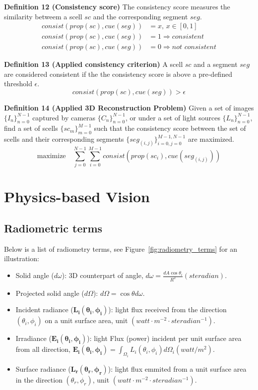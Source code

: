 \noindent\textbf{Definition 12 (Consistency score)} The consistency score measures the similarity betweem a scell $sc$ and the corresponding segment $seg$.
\begin{align*}
consist(prop(sc), cue(seg)) &= x \text{, } x\in[0, 1]\\
consist(prop(sc), cue(seg)) &= 1 \Rightarrow \textit{consistent}\\
consist(prop(sc), cue(seg)) &= 0 \Rightarrow \textit{not consistent}
\end{align*}

\noindent\textbf{Definition 13 (Applied consistency criterion)} A scell $sc$ and a segment $seg$ are considered consistent if the the consistency score is above a pre-defined threshold $\epsilon$.
$$
consist(prop(sc), cue(seg)) > \epsilon
$$


\noindent\textbf{Definition 14 (Applied 3D Reconstruction Problem)} Given a set of images $\{I_n\}_{n=0}^{N-1}$ captured by cameras $\{C_n\}_{n=0}^{N-1}$, or under a set of light sources $\{L_n\}_{n=0}^{N-1}$, find a set of scells $\{sc_m\}_{m=0}^{M-1}$ such that the consistency score between the set of scells and their corresponding segments $\{seg_{(i, j)}\}_{i=0,j=0}^{M-1,N-1}$ are maximized.
$$
\mbox{maximize} \quad \sum_{j=0}^{N-1}\sum_{i=0}^{M-1} consist(prop(sc_i), cue(seg_{(i, j)}))
$$

\section{Physics-based Vision}
\label{sec:pbv}

\subsection{Radiometric terms}
\label{sec:radio_term}
Below is a list of radiometry terms, see Figure~\ref{fig:radiometry_terms} for an illustration:
\begin{itemize}
\item Solid angle ($d\omega$): 3D counterpart of angle, $d\omega=\frac{dA \cos\theta_i}{R^2}\mathit{ (steradian)}$.
\item Projected solid angle ($d\Omega$): $d\Omega = \cos\theta d\omega$.
\item Incident radiance ($\mathbf{L_i(\theta_i, \phi_i)}$): light flux received from the direction $(\theta_i, \phi_i)$ on a unit surface area, unit $\mathit{ (watt\cdot m^{-2}\cdot steradian^{-1})}$.
\item Irradiance ($\mathbf{E_i(\theta_i, \phi_i)}$): light Flux (power) incident per unit surface area from all direction, $\mathbf{E_i(\theta_i, \phi_i)}=\int_{\Omega_i} L_i(\theta_i, \phi_i) d\Omega_i \mathit{ (watt/m^2)}$.
\item Surface radiance ($\mathbf{L_r(\theta_r, \phi_r)}$): light flux emmited from a unit surface area in the direction $(\theta_r, \phi_r)$, unit $\mathit{ (watt\cdot m^{-2}\cdot steradian^{-1})}$.
\end{itemize}

